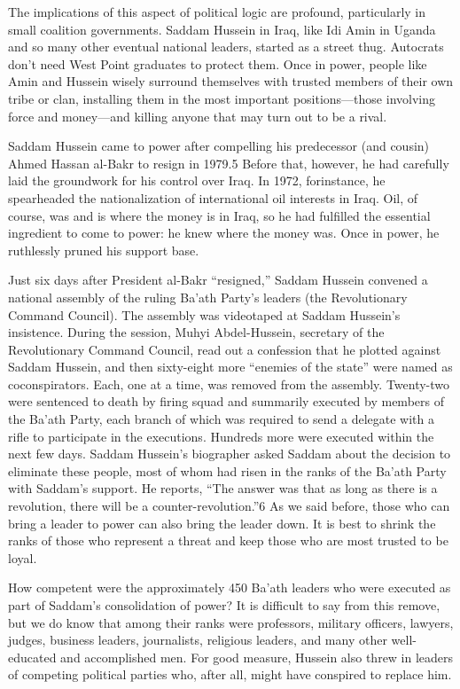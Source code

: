\documentclass[10pt]{article}
\begin{document}
{\large The implications of this aspect of political logic are profound,
particularly in small coalition governments. Saddam Hussein in Iraq, like Idi
Amin in Uganda and so many other eventual national leaders, started as a street
thug. Autocrats don't need West Point graduates to protect them. Once in power,
people like Amin and Hussein wisely surround themselves with trusted members of
their own tribe or clan, installing them in the most important positions---those
involving force and money---and killing anyone that may turn out to be a rival.}

{\large Saddam Hussein came to power after compelling his predecessor (and
cousin) Ahmed Hassan al-Bakr to resign in 1979.5 Before that, however, he had
carefully laid the groundwork for his control over Iraq. In 1972, forinstance, he
spearheaded the nationalization of international oil interests in Iraq. Oil, of
course, was and is where the money is in Iraq, so he had fulfilled the essential
ingredient to come to power: he knew where the money was. Once in power, he
ruthlessly pruned his support base.}

{\large Just six days after President al-Bakr ``resigned,'' Saddam Hussein
convened a national assembly of the ruling Ba'ath Party's leaders (the
Revolutionary Command Council). The assembly was videotaped at Saddam Hussein's
insistence. During the session, Muhyi Abdel-Hussein, secretary of the
Revolutionary Command Council, read out a confession that he plotted against
Saddam Hussein, and then sixty-eight more ``enemies of the state'' were named as
coconspirators. Each, one at a time, was removed from the assembly. Twenty-two
were sentenced to death by firing squad and summarily executed by members of the
Ba'ath Party, each branch of which was required to send a delegate with a rifle
to participate in the executions. Hundreds more were executed within the next few
days. Saddam Hussein's biographer asked Saddam about the decision to eliminate
these people, most of whom had risen in the ranks of the Ba'ath Party with
Saddam's support. He reports, ``The answer was that as long as there is a
revolution, there will be a counter-revolution.''6 As we said before, those who
can bring a leader to power can also bring the leader down. It is best to shrink
the ranks of those who represent a threat and keep those who are most trusted to
be loyal.}

{\large How competent were the approximately 450 Ba'ath leaders who were
executed as part of Saddam's consolidation of power? It is difficult to say from
this remove, but we do know that among their ranks were professors, military
officers, lawyers, judges, business leaders, journalists, religious leaders, and
many other well-educated and accomplished men. For good measure, Hussein also
threw in leaders of competing political parties who, after all, might have
conspired to replace him.}
\end{document}
